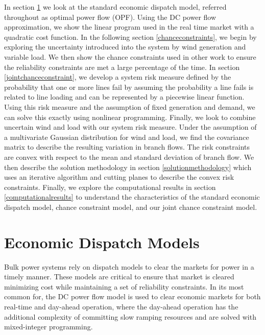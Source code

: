 In section \ref{economicdispatch} we look at the standard economic dispatch model, referred throughout as optimal power flow (OPF).  Using the DC power flow approximation, we show the linear program used in the real time market with a quadratic cost function. In the following section \ref{chanceconstraints}, we begin by exploring the uncertainty introduced into the system by wind generation and variable load.  We then show the chance constraints used in other work to ensure the reliability constraints are met a large percentage of the time.  In section \ref{jointchanceconstraint}, we develop a system risk measure defined by the probability that one or more lines fail by assuming the probability a line fails is related to line loading and can be represented by a piecewise linear function.  Using this risk measure and the assumption of fixed generation and demand, we can solve this exactly using nonlinear programming.  Finally, we look to combine uncertain wind and load with our system risk measure.  Under the assumption of a multivariate Gaussian distribution for wind and load, we find the covariance matrix to describe the resulting variation in branch flows.  The risk constraints are convex with respect to the mean and standard deviation of branch flow.  We then describe the solution methodology in section \ref{solutionmethodology} which uses an iterative algorithm and cutting planes to describe the convex risk constraints.  Finally, we explore the computational results in section \ref{computationalresults} to understand the characteristics of the standard economic dispatch model, chance constraint model, and our joint chance constraint model.


\section{Economic Dispatch Models}\label{economicdispatch}
Bulk power systems rely on dispatch models to clear the markets for power in a timely manner.  These models are critical to ensure that market is cleared minimizing cost while maintaining a set of reliability constraints.  In its most common for, the DC power flow model is used to clear economic markets for both real-time and day-ahead operation, where the day-ahead operation has the additional complexity of committing slow ramping resources and are solved with mixed-integer programming. 


